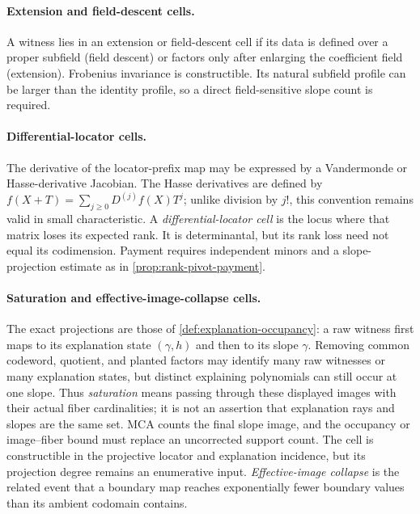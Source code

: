\documentclass[12pt,a4paper]{amsart}
\numberwithin{equation}{section}
\theoremstyle{remark}
\begin{document}
\paragraph{Extension and field-descent cells.}
A witness lies in an extension or field-descent cell if its data is defined over
a proper subfield (field descent) or factors only after enlarging the coefficient
field (extension).  Frobenius invariance is
constructible.  Its natural subfield profile can be larger than the
identity profile, so a direct field-sensitive slope count is required.

\paragraph{Differential-locator cells.}
The derivative of the locator-prefix map may be expressed by a Vandermonde
or Hasse-derivative Jacobian.  The Hasse derivatives are defined by
\(f(X+T)=\sum_{j\ge0}D^{(j)}f(X)T^j\); unlike division by \(j!\), this
convention remains valid in small characteristic.  A
\emph{differential-locator cell} is the
locus where that matrix loses its expected rank.  It is determinantal, but
its rank loss
need not equal its codimension.  Payment requires independent minors and a
slope-projection estimate as in \cref{prop:rank-pivot-payment}.

\paragraph{Saturation and effective-image-collapse cells.}
The exact projections are those of
\cref{def:explanation-occupancy}: a raw witness first maps to its
explanation state \((\gamma,h)\) and then to its slope \(\gamma\).
Removing common codeword, quotient, and planted factors may identify many
raw witnesses or many explanation states, but distinct explaining
polynomials can still occur at one slope.  Thus \emph{saturation} means
passing through these displayed images with their actual fiber
cardinalities; it is not an assertion that explanation rays and slopes are
the same set.  MCA counts the final slope image, and the occupancy or
image--fiber bound must replace an uncorrected support count.  The cell is
constructible in the projective locator and explanation incidence, but its
projection degree remains an enumerative input.
\emph{Effective-image collapse} is the related event that a boundary map
reaches exponentially fewer boundary values than its ambient codomain contains.
\end{document}
